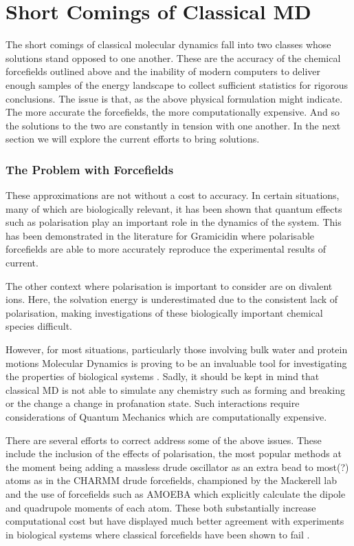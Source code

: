 \section{Short Comings of Classical MD}
The short comings of classical molecular dynamics fall into two classes whose solutions stand opposed to one another. These are the accuracy of the chemical forcefields outlined above and the inability of modern computers to deliver enough samples of the energy landscape to collect sufficient statistics for rigorous conclusions. The issue is that, as the above physical formulation might indicate. The more accurate the forcefields, the more computationally expensive. And so the solutions to the two are constantly in tension with one another. In the next section we will explore the current efforts to bring solutions.

\subsubsection{The Problem with Forcefields}
These approximations are not without a cost to accuracy. In certain situations, many of which are biologically relevant, it has been shown that quantum effects such as polarisation play an important role in the dynamics of the system. This has been demonstrated in the literature for Gramicidin where polarisable forcefields are able to more accurately reproduce the experimental results of current.

The other context where polarisation is important to consider are on divalent ions. Here, the solvation energy is underestimated due to the consistent lack of polarisation, making investigations of these biologically important chemical species difficult.

However, for most situations, particularly those involving bulk water and protein motions Molecular Dynamics is proving to be an invaluable tool for investigating the properties of biological systems \cite{hollingsworth2018}. Sadly, it should be kept in mind that classical MD is not able to simulate any chemistry such as forming and breaking or the change a change in profanation state. Such interactions require considerations of Quantum Mechanics which are computationally expensive.

There are several efforts to correct address some of the above issues. These include the inclusion of the effects of polarisation, the most popular methods at the moment being adding a massless drude oscillator as an extra bead to most(?) atoms as in the CHARMM drude forcefields, championed by the Mackerell lab and the use of forcefields such as AMOEBA which explicitly calculate the dipole and quadrupole moments of each atom. These both substantially increase computational cost but have displayed much better agreement with experiments in biological systems where classical forcefields have been shown to fail \cite{ngo2021}. 

